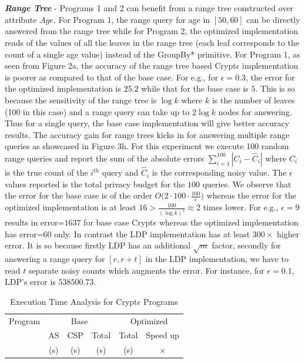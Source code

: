 \\\\\textit{\textbf{Range Tree}} - Programs 1 and 2 can benefit from a range tree constructed over attribute $Age$. For Program 1, the range query for age in $[50,60]$ can be directly answered from the range tree while for Program 2, the optimized implementation reads of the values of all the leaves in  the range tree (each leaf corresponds to the count of a single age value) instead of the \textsf{GroupBy*} primitive. For Program 1, as seen from Figure 2a, the accuracy of the range tree based Crypt$\epsilon$ implementation is poorer as compared to that of the base case. For e.g., for $\epsilon=0.3$, the error for the optimized implementation is $25.2$ while that for the base case is $5$. This is so because the sensitivity of the range tree is $\log k$ where $k$ is the number of leaves (100 in this case) and a range query can take up to $2 \log k$ nodes for answering. Thus for a single query, the base case implementation will give better accuracy results. The accuracy gain for range trees kicks in for answering multiple range queries as showcased in Figure 3h.  For this experiment we execute 100 random range queries and report the sum of the absolute errors $\sum_{i=1}^100|C_i-\hat{C}_i|$ where $C_i$ is the true count of the $i^{th}$ query and $\hat{C}_i$ is the corresponding noisy value. The $\epsilon$ values reported is the total privacy budget for the $100$ queries. We observe that the error for the base case is of the order $O\big(2\cdot100\cdot\frac{100}{\epsilon}\big)$ whereas the error for the optimized implementation is at least $16 > \frac{100}{(\log k)^2}\approx 2 $ times lower.  For e.g., $\epsilon=9$ results in error=$1637$ for base case Crypt$\epsilon$ whereas the optimized implementation has error=$60$ only. In contrast the \textsf{LDP} implementation has at least $300\times$ higher error. It is so because firstly \textsf{LDP} has an additional $\sqrt{m}$ factor, secondly for answering a range query for $[r,r+t]$ in the \textsf{LDP} implementation, we have to read $t$ separate noisy counts which augments the error. For instance, for $\epsilon=0.1$, \textsf{LDP}'s error is $538500.73$. \begin{table}[ht]
\caption{Execution Time Analysis for Crypt$\epsilon$ Programs}
\centering
\begin{tabular}{c  c c c c c}
\toprule
Program &  \multicolumn{3}{c}{Base} & \multicolumn{2}{c}{Optimized} \\ 
 & AS &  CSP & Total & Total & Speed up  \\ &(s)&(s)&(s)&(s)&$\times$\\ %

\end{tabular}
\end{table}
